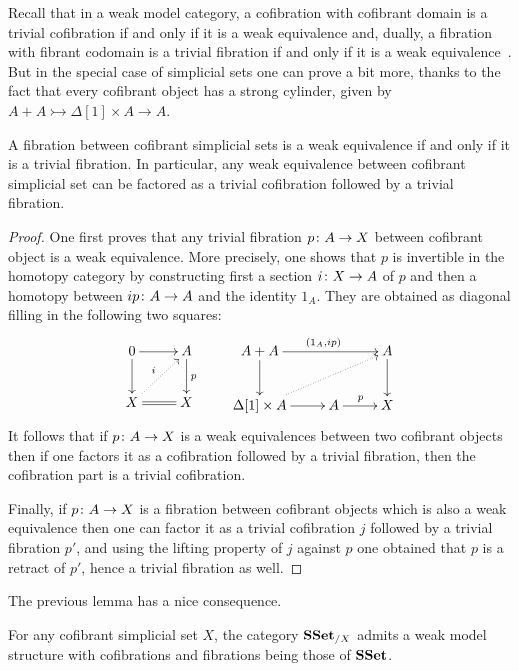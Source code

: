 \documentclass[reqno,10pt,a4paper,oneside,draft]{amsart}
\begin{document}
\bigskip


Recall that in a weak model category, a  cofibration with cofibrant domain is a trivial cofibration if and only if it is a weak equivalence and, dually, a fibration with fibrant codomain is a trivial fibration if and only if it is a  weak equivalence~\cite[Proposition 2.2.9]{henry2018wms}. But in the special case of simplicial sets one can prove a bit more,
thanks to the fact that every cofibrant object has a strong cylinder, given by~$A + A \rightarrowtail \Delta[1] \times A \rightarrow A$.
 


\begin{lemma}\label{lemma:triv_fib_are_we}
A fibration between cofibrant simplicial sets is a weak equivalence if and only if it is a trivial fibration.
In particular, any weak equivalence between cofibrant simplicial set can be factored as a trivial cofibration followed by a trivial fibration.
\end{lemma}

\begin{proof}
One first proves that any trivial fibration  $p \colon A \to X$ between cofibrant object is a weak equivalence. More precisely, one shows that $p$ is invertible in the homotopy category by constructing first a section $i \colon X \rightarrow A$ of $p$ and then a homotopy between $i  p \colon A \to A$ and the identity $1_{A}$. They are obtained as diagonal filling in the following two squares:
\[
\xymatrix{0 \ar[r] \ar[d] & A \ar[d]^{p} \\ 
X \ar@{.>}[ur]^{i} \ar@{=}[r] & X}
\qquad
\xymatrix{A + A \ar[rr]^{(1_{A} , i  p)} \ar[d] & &  A \ar[d] \\ \Delta[1] \times A \ar@{.>}[rru] \ar[r]& A \ar[r]^{p} & X  }
\]
It follows that if $p \colon A \rightarrow X$ is a weak equivalences between two cofibrant objects then if one factors it as a cofibration followed by a trivial fibration, then the cofibration part is a trivial cofibration. 

Finally, if $p \colon A \to X$ is a fibration between cofibrant objects which is also a weak equivalence then one can factor it as a trivial cofibration $j$ followed by a trivial fibration $p'$, and using the lifting property of $j$ against $p$ one obtained that $p$ is a retract of $p'$, hence a trivial fibration as well.
\end{proof}

The previous lemma has a nice consequence.

\begin{corollary}
For any cofibrant simplicial set $X$, the category $\mathbf{SSet}_{/X}$ admits a weak model structure with cofibrations and fibrations  being those of $\mathbf{SSet}$.
\end{corollary}
\end{document}

